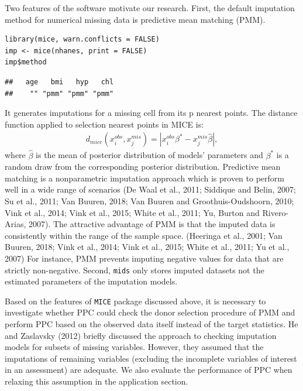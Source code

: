 \documentclass[12pt, fullpage, a4paper]{article}
\begin{document}
Two features of the software motivate our research. First, the default imputation method for numerical missing data is predictive mean matching (PMM).
\begin{lstlisting}
library(mice, warn.conflicts = FALSE)
imp <- mice(nhanes, print = FALSE)
imp$method
\end{lstlisting}
\begin{verbatim}
##   age   bmi   hyp   chl 
##    "" "pmm" "pmm" "pmm"
\end{verbatim}
It generates imputations for a missing cell from its p nearest points. The distance function applied to selection nearest points in MICE is:
\begin{equation}
\begin{array}{ll}
d_{mice}(x_{i}^{obs}, x_{j}^{mis}) = |x_{i}^{obs}\beta^{*} - x_{j}^{mis}\hat{\beta}|,
\end{array} 
\end{equation}
where $\hat{\beta}$ is the mean of posterior distribution of models' parameters and $\beta^{*}$ is a random draw from the corresponding posterior distribution. Predictive mean matching is a nonparametric imputation approach which is proven to perform well in a wide range of scenarios (De Waal et al., 2011;\nocite{de2011handbook} Siddique and Belin, 2007;\nocite{siddique2008multiple} Su et al., 2011;\nocite{su2011multiple} Van Buuren, 2018; Van Buuren and Groothuis-Oudshoorn, 2010; Vink et al., 2014;\nocite{vink2014predictive} Vink et al., 2015;\nocite{vink2015partioned} White et al., 2011; Yu, Burton and Rivero-Arias, 2007\nocite{yu2007evaluation}). The attractive advantage of PMM is that the imputed data is consistently within the range of the sample space. (Heeringa et al., 2001;\nocite{heeringa2001multivariate} Van Buuren, 2018; Vink et al., 2014; Vink et al., 2015; White et al., 2011; Yu et al., 2007) For instance, PMM prevents imputing negative values for data that are strictly non-negative. Second, \texttt{mids} only stores imputed datasets not the estimated parameters of the imputation models. 

Based on the features of \texttt{MICE} package discussed above, it is necessary to investigate whether PPC could check the donor selection procedure of PMM and perform PPC based on the observed data itself instead of the target statistics. He and Zaslavsky (2012) briefly discussed the approach to checking imputation models for subsets of missing variables. However, they assumed that the imputations of remaining variables (excluding the incomplete variables of interest in an assessment) are adequate. We also evaluate the performance of PPC when relaxing this assumption in the application section.      
\end{document}
